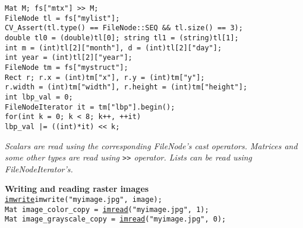 \documentclass[10pt,landscape]{article}
\begin{document}
\begin{multicols}{3}
\begin{tabbing}
\texttt{Mat M; fs["mtx"] >> M;}\\

\texttt{FileNode tl = fs["mylist"];}\\
\texttt{CV\_Assert(tl.type() == FileNode::SEQ \&\& tl.size() == 3);}\\
\texttt{double tl0 = (double)tl[0]; string tl1 = (string)tl[1];}\\

\texttt{int m = (int)tl[2]["month"], d = (int)tl[2]["day"];}\\
\texttt{int year = (int)tl[2]["year"];}\\

\texttt{FileNode tm = fs["mystruct"];}\\

\texttt{Rect r; r.x = (int)tm["x"], r.y = (int)tm["y"];}\\
\texttt{r.width = (int)tm["width"], r.height = (int)tm["height"];}\\
 
\texttt{int lbp\_val = 0;}\\
\texttt{FileNodeIterator it = tm["lbp"].begin();}\\

\texttt{for(int k = 0; k < 8; k++, ++it)}\\
\>\texttt{lbp\_val |= ((int)*it) << k;}\\
\end{tabbing}

\emph{Scalars are read using the corresponding FileNode's cast operators. Matrices and some other types are read using \texttt{>>} operator. Lists can be read using FileNodeIterator's.}

\begin{tabbing}
\textbf{Wr}\=\textbf{iting and reading raster images}\\
\texttt{\href{http://opencv.willowgarage.com/documentation/cpp/highgui_reading_and_writing_images_and_video.html\#cv-imwrite}{imwrite}{imwrite}("myimage.jpg", image);}\\
\texttt{Mat image\_color\_copy = \href{http://opencv.willowgarage.com/documentation/cpp/highgui_reading_and_writing_images_and_video.html\#cv-imread}{imread}("myimage.jpg", 1);}\\
\texttt{Mat image\_grayscale\_copy = \href{http://opencv.willowgarage.com/documentation/cpp/highgui_reading_and_writing_images_and_video.html\#cv-imread}{imread}("myimage.jpg", 0);}\\
\end{tabbing}


\end{multicols}
\end{document}
